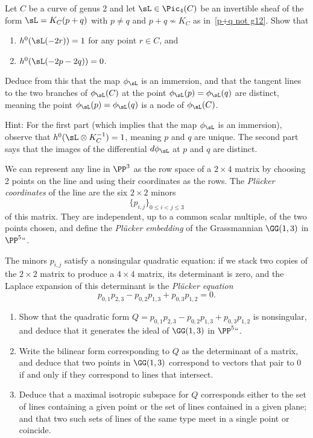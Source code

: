 \begin{exercise}
\label{nodal quartic}
Let $C$ be a  curve of genus 2 and let $\sL\in \Pic_4(C)$ be an invertible
sheaf of the form $\sL = K_C(p+q)$ with $p \neq q$ and $p+q \not\sim K_C$
as in~\ref{p+q not g12}. Show that
\begin{enumerate}
\item $h^0(\sL(-2r))= 1$ for any point $r \in C$, and
\item $h^0(\sL(-2p-2q)) = 0$.
\end{enumerate}
Deduce from this that the map $\phi_\sL$ is an immersion, and that the
tangent lines to the two branches of $\phi_\sL(C)$ at the point $\phi_\sL(p)
= \phi_\sL(q)$ are distinct, meaning the point $\phi_\sL(p) = \phi_\sL(q)$
is a node of $\phi_\sL(C)$.

Hint: For the first part (which implies that the map $\phi_\sL$ is an
immersion), observe that $h^0(\sL\otimes K_C^{-1}) = 1$, meaning $p$ and $q$
are unique. The second part says that the images of the differential
$d\phi_\sL$ at $p$ and $q$ are distinct.
\end{exercise}

\begin{exercise}
\label{G13}
We can represent any line in $\PP^3$ as the row space of a $2\times 4$ matrix by choosing
 2 points on the line and
using their
coordinates as the rows. The \emph{Pl\"ucker coordinates} of the line are
%
the six $2\times 2$ minors
$$
\{p_{i,j}\}_{0\leq i<j\leq 3}
$$
of this matrix. They are independent, up to a common scalar multiple,
of the two points chosen, and define the \emph{Pl\"ucker embedding}
%
of the 
Grassmannian
%
$\GG(1,3)$ in $\PP^5` `$.

The minors $p_{i,j}$  satisfy a nonsingular quadratic equation: if we
stack two copies of the $2\times 2$
matrix to produce a $4\times 4$ matrix, its determinant is zero, and
the Laplace expansion of this determinant
is the \emph{Pl\"ucker equation}
%
$$
p_{0,1}p_{2,3}-p_{0,2}p_{1,3}+p_{0,3}p_{1,2} = 0.
$$

\begin{enumerate}
\item Show that the quadratic form
$
Q = p_{0,1}p_{2,3}-p_{0,2}p_{1,3}+p_{0,3}p_{1,2}
$
is non\-singular, and deduce that it generates the ideal of $\GG(1,3)$
in $\PP^5` `$.
\item
Write the bilinear form corresponding to $Q$ as the determinant of a
matrix, and deduce that
two points in $\GG(1,3)$ correspond to vectors that pair to 0 if and
only if they correspond to lines that intersect.
\item Deduce that a maximal isotropic subspace for $Q$ corresponds either to
the set of lines containing a given point or the set of lines contained
in a given plane; and that two such sets of lines 
of the same type
meet in a single point or coincide.
\end{enumerate}
\end{exercise}


